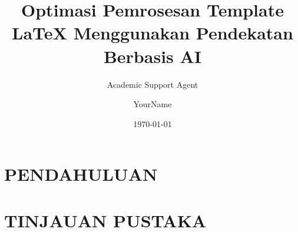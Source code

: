 \documentclass{article}
\title{Optimasi Pemrosesan Template LaTeX Menggunakan Pendekatan Berbasis AI}
\author{Academic Support Agent}
\date{\today}
\begin{document}
\maketitle

\begin{abstract}

\end{abstract}

\chapter{PENDAHULUAN}


\chapter{TINJAUAN PUSTAKA}


\usepackage[utf8]{inputenc}
\usepackage{CJKutf8}
\usepackage{tabularx}
\usepackage{array}



\usepackage{TLCresume}

\author{YourName} %
\def\phone{YourPhoneNumber}
\def\city{YourLocation}
\def\email{You@Email.com}
\def\LinkedIn{LIHandle} %
\def\github{YourGitHub} %
\def\role{YourTitle} %
\end{document}
